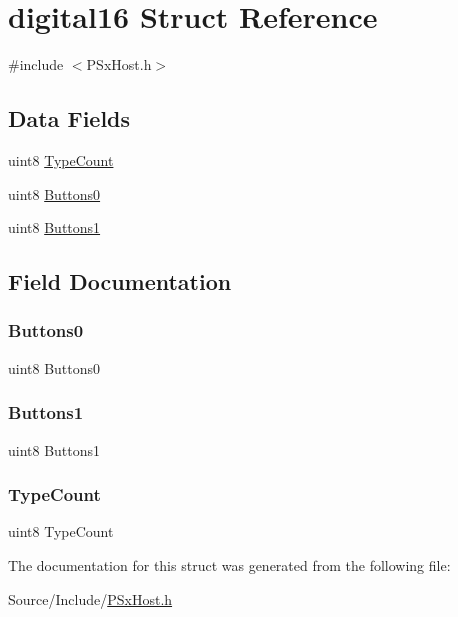 \hypertarget{structdigital16}{}\section{digital16 Struct Reference}
\label{structdigital16}


{\ttfamily \#include $<$P\+Sx\+Host.\+h$>$}

\subsection*{Data Fields}
\begin{DoxyCompactItemize}
\item 
uint8 \mbox{\hyperlink{structdigital16_af8950e4872b4b4b5dd2b837ac45a0603}{Type\+Count}}
\item 
uint8 \mbox{\hyperlink{structdigital16_a0d9f38dcaa6d84c7fc78d434b839f259}{Buttons0}}
\item 
uint8 \mbox{\hyperlink{structdigital16_a17ebb8fd1844de7d6545c9f96194d300}{Buttons1}}
\end{DoxyCompactItemize}


\subsection{Field Documentation}
\mbox{\label{structdigital16_a0d9f38dcaa6d84c7fc78d434b839f259}} 
\subsubsection{\texorpdfstring{Buttons0}{Buttons0}}
{\footnotesize\ttfamily uint8 Buttons0}

\mbox{\label{structdigital16_a17ebb8fd1844de7d6545c9f96194d300}} 
\subsubsection{\texorpdfstring{Buttons1}{Buttons1}}
{\footnotesize\ttfamily uint8 Buttons1}

\mbox{\label{structdigital16_af8950e4872b4b4b5dd2b837ac45a0603}} 
\subsubsection{\texorpdfstring{Type\+Count}{TypeCount}}
{\footnotesize\ttfamily uint8 Type\+Count}



The documentation for this struct was generated from the following file\+:\begin{DoxyCompactItemize}
\item 
Source/\+Include/\mbox{\hyperlink{_p_sx_host_8h}{P\+Sx\+Host.\+h}}\end{DoxyCompactItemize}
